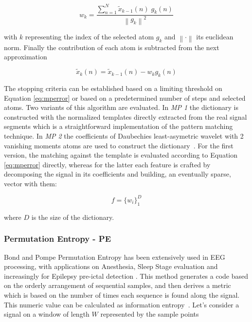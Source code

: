 \begin{equation}
w_{k} =  \frac{\sum_{n=1}^{N} \tilde{x}_{k-1}(n) \; g_{k}(n)}{  {\left\lVert  g_{k} \right\rVert}^{2} }
\label{eq:mp4}
\end{equation}

\noindent with $k$ representing the index of the selected atom $g_{k}$ and $\left\lVert \cdot \right\rVert$ its euclidean norm.  Finally the contribution of each atom is subtracted from the next approximation~\cite{Cohen2014,Sanei2007, Mallat1993}

\begin{equation}
\tilde{x}_{k}(n)=  \tilde{x}_{k-1}(n) - w_{k} g_{k} (n)
\label{eq:mp5}
\end{equation}

The stopping criteria can be established based on a limiting threshold on Equation \ref{eq:mperror} or based on a predetermined number of steps and selected atoms.  Two variants of this algorithm are evaluated. In \textit{MP 1} the dictionary is constructed with the normalized templates directly extracted from the real signal segments which is a straightforward implementation of the pattern matching technique.  In \textit{MP 2} the coefficients of Daubechies least-asymetric wavelet with 2 vanishing moments atoms are used to construct the dictionary~\cite{Vareka2012}.  For the first version, the matching against the template is evaluated according to Equation \ref{eq:mperror} directly, whereas for the latter each feature is crafted by decomposing the signal in its coefficients and building, an eventually sparse, vector with them:

\begin{equation}
f =  {\bigg \{ w_{i} \bigg \}}_{1}^{D} 
\label{eq:mp6}
\end{equation}

\noindent where $D$ is the size of the dictionary.  



\subsubsection{Permutation Entropy - PE}

Bond and Pompe Permutation Entropy has been extensively used in EEG processing, with applications on Anesthesia, Sleep Stage evaluation and increasingly for Epilepsy pre-ictal detection \cite{Bandt2002}.  This method generates a code based on the orderly arrangement of sequential samples, and then derives a metric which is based on the number of times each sequence is found along the signal.  This numeric value can be calculated as information entropy~\cite{Nicolaou2010}. Let's consider a signal on a window of length $W$ represented by the sample points

